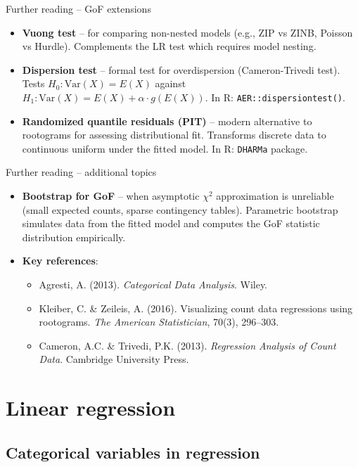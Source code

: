 \documentclass[10pt,ignorenonframetext,aspectratio=169]{beamer}
\begin{document}
\begin{frame}{Further reading -- GoF extensions}
\begin{itemize}
    \item \textbf{Vuong test} -- for comparing non-nested models (e.g., ZIP vs ZINB, Poisson vs Hurdle). Complements the LR test which requires model nesting.
    \item \textbf{Dispersion test} -- formal test for overdispersion (Cameron-Trivedi test). Tests $H_0: \text{Var}(X) = E(X)$ against $H_1: \text{Var}(X) = E(X) + \alpha \cdot g(E(X))$. In R: \texttt{AER::dispersiontest()}.
    \item \textbf{Randomized quantile residuals (PIT)} -- modern alternative to rootograms for assessing distributional fit. Transforms discrete data to continuous uniform under the fitted model. In R: \texttt{DHARMa} package.
\end{itemize}
\end{frame}

\begin{frame}{Further reading -- additional topics}
\begin{itemize}
    \item \textbf{Bootstrap for GoF} -- when asymptotic $\chi^2$ approximation is unreliable (small expected counts, sparse contingency tables). Parametric bootstrap simulates data from the fitted model and computes the GoF statistic distribution empirically.
    \item \textbf{Key references}:
    \begin{itemize}
        \item Agresti, A. (2013). \textit{Categorical Data Analysis}. Wiley.
        \item Kleiber, C. \& Zeileis, A. (2016). Visualizing count data regressions using rootograms. \textit{The American Statistician}, 70(3), 296--303.
        \item Cameron, A.C. \& Trivedi, P.K. (2013). \textit{Regression Analysis of Count Data}. Cambridge University Press.
    \end{itemize}
\end{itemize}
\end{frame}

\section{Linear regression}

\subsection{Categorical variables in regression}
\end{document}

